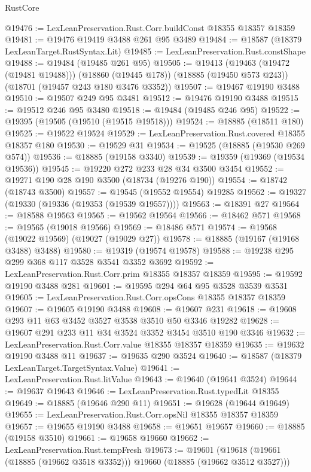 \begin{lexlean}{RustCore}
\begin{coremodule}
@19476 := LexLeanPreservation.Rust.Corr.buildConst @18355 @18357 @18359
@19481 := @19476 @19419 @3488 @261 @95 @3489
@19484 := @18587 (@18379 LexLeanTarget.RustSyntax.Lit)
@19485 := LexLeanPreservation.Rust.constShape
@19488 := @19484 (@19485 @261 @95)
@19505 := @19413
    (@19463 (@19472 (@19481 @19488)))
    (@18860 (@19445 @178))
    (@18885 (@19450 @573 @243))
    (@18701 (@19457 @243 @180 @3476 @3352))
@19507 := @19467 @19190 @3488
@19510 := @19507 @249 @95 @3481
@19512 := @19476 @19190 @3488
@19515 := @19512 @246 @95 @3480
@19518 := @19484 (@19485 @246 @95)
@19522 := @19395 (@19505 (@19510 (@19515 @19518)))
@19524 := @18885 (@18511 @180)
@19525 := @19522 @19524
@19529 := LexLeanPreservation.Rust.covered @18355 @18357 @180
@19530 := @19529 @31
@19534 := @19525 (@18885 (@19530 @269 @574))
@19536 := @18885 (@19158 @3340)
@19539 := @19359 (@19369 (@19534 @19536))
@19545 := @19220 @272 @233 @28 @34 @3500 @3454
@19552 := @19271 @190 @28 @190 @3500 (@18734 (@19276 @190))
@19554 := @18742 (@18743 @3500)
@19557 := @19545 (@19552 @19554) @19285
@19562 := @19327 (@19330 (@19336 (@19353 (@19539 @19557))))
@19563 := @18391 @27
@19564 := @18588 @19563
@19565 := @19562 @19564
@19566 := @18462 @571
@19568 := @19565 (@19018 @19566)
@19569 := @18486 @571
@19574 := @19568 (@19022 @19569) (@19027 (@19029 @27))
@19578 := @18885 (@19167 (@19168 @3488) @3488)
@19580 := @19319 (@19574 @19578)
@19588 := @19238 @295 @299 @368 @117 @3528 @3541 @3352 @3692
@19592 := LexLeanPreservation.Rust.Corr.prim @18355 @18357 @18359
@19595 := @19592 @19190 @3488 @281
@19601 := @19595 @294 @64 @95 @3528 @3539 @3531
@19605 := LexLeanPreservation.Rust.Corr.opsCons @18355 @18357 @18359
@19607 := @19605 @19190 @3488
@19608 := @19607 @231
@19618 := @19608 @293 @11 @63 @3452 @3527 @3538 @3510 @50 @3346 @19282
@19628 := @19607 @291 @233 @11 @34 @3524 @3352 @3454 @3510 @190 @3346
@19632 := LexLeanPreservation.Rust.Corr.value @18355 @18357 @18359
@19635 := @19632 @19190 @3488 @11
@19637 := @19635 @290 @3524
@19640 := @18587 (@18379 LexLeanTarget.TargetSyntax.Value)
@19641 := LexLeanPreservation.Rust.litValue
@19643 := @19640 (@19641 @3524)
@19644 := @19637 @19643
@19646 := LexLeanPreservation.Rust.typedLit @18355
@19649 := @18885 (@19646 @290 @11)
@19651 := @19628 (@19644 @19649)
@19655 := LexLeanPreservation.Rust.Corr.opsNil @18355 @18357 @18359
@19657 := @19655 @19190 @3488
@19658 := @19651 @19657
@19660 := @18885 (@19158 @3510)
@19661 := @19658 @19660
@19662 := LexLeanPreservation.Rust.tempFresh
@19673 := @19601
    (@19618 (@19661 (@18885 (@19662 @3518 @3352))) @19660 (@18885 (@19662 @3512 @3527)))

\end{coremodule}
\end{lexlean}
